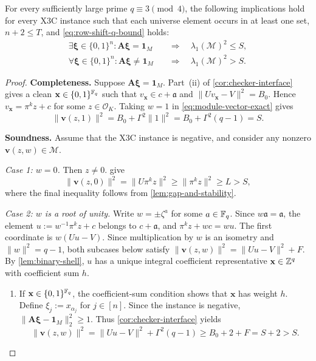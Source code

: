\begin{theorem}
\label{thm:exact-X3C-encoding}
For every sufficiently large prime $q\equiv3\pmod4$, the
following implications hold for every X3C instance such that each universe
element occurs in at least one set, $n+2\le T$, and
\cref{eq:row-shift-q-bound} holds:
\begin{align*}
 \exists\boldsymbol\xi\in\{0,1\}^n:
 \mathbf A\boldsymbol\xi=\mathbf1_M
 &\quad\Longrightarrow\quad
 \lambda_1(\mathcal M)^2\le S,\\
 \forall\boldsymbol\xi\in\{0,1\}^n:
 \mathbf A\boldsymbol\xi\ne\mathbf1_M
 &\quad\Longrightarrow\quad
 \lambda_1(\mathcal M)^2>S.
\end{align*}
\end{theorem}

\begin{proof}
\noindent\textbf{Completeness.}
Suppose $\mathbf A\boldsymbol\xi=\mathbf1_M$.
Part~(ii) of \cref{cor:checker-interface} gives a clean
$\mathbf x\in\{0,1\}^{\mathbb F_q}$ such that
$v_{\mathbf x}\in c+\mathfrak a$ and $\|Uv_{\mathbf x}-V\|^2=B_0$.
Hence $v_{\mathbf x}=\pi^kz+c$ for some
$z\in \mathcal{O}_K$.  Taking $w=1$ in
\cref{eq:module-vector-exact} gives
\[
 \|\mathbf v(z,1)\|^2
 =B_0+\Gamma^2\|1\|^2
 =B_0+\Gamma^2(q-1)=S.
\]

\medskip
\noindent\textbf{Soundness.}
Assume that the X3C instance is negative, and consider any nonzero
$\mathbf v(z,w)\in\mathcal M$.

\smallskip
\noindent\emph{Case 1: $w=0$.}
Then $z\ne0$.  
give
\[
 \|\mathbf v(z,0)\|^2
 =\|U\pi^kz\|^2
 \ge\|\pi^kz\|^2
 \ge L>S,
\]
where the final inequality follows from
\cref{lem:gap-and-stability}.

\smallskip
\noindent\emph{Case 2: $w$ is a root of unity.}
Write $w=\pm\zeta^a$ for some $a\in\mathbb F_q$.  Since
$w\mathfrak a=\mathfrak a$, the element
$u:=w^{-1}\pi^kz+c$ belongs to $c+\mathfrak a$, and
$\pi^kz+wc=wu$.  The first coordinate is $w(Uu-V)$.
Since multiplication by $w$ is an isometry and $\|w\|^2=q-1$,
both subcases below satisfy
$\|\mathbf v(z,w)\|^2=\|Uu-V\|^2+F$.  By
\cref{lem:binary-shell}, $u$ has a
unique integral coefficient representative
$\mathbf x\in\mathbb Z^q$ with coefficient sum $h$.

\begin{enumerate}[label=(\alph*)]
\item If $\mathbf x\in\{0,1\}^{\mathbb F_q}$, the coefficient-sum condition shows that
$\mathbf x$ has weight $h$.  Define
$\xi_j:=x_{\alpha_j}$ for $j\in[n]$.  Since the instance is negative,
$\|\mathbf A\boldsymbol\xi-\mathbf1_M\|_2^2\ge1$.  Thus
\cref{cor:checker-interface} yields
\[
 \|\mathbf v(z,w)\|^2
 =\|Uu-V\|^2+\Gamma^2(q-1)\ge B_0+2+F=S+2>S.
\]


\end{enumerate}
\end{proof}
